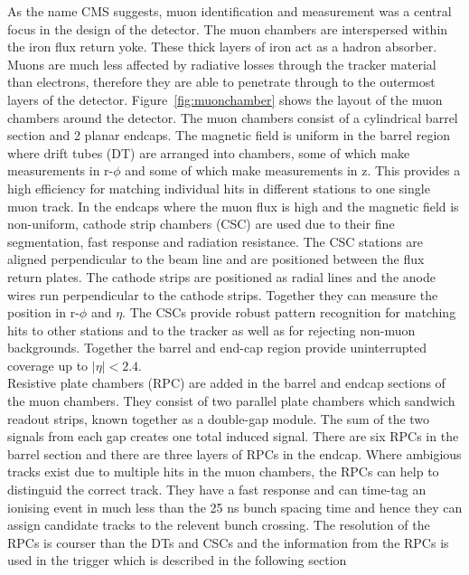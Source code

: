 As the name CMS suggests, muon identification and measurement was a central focus in the design of the detector. The muon chambers are interspersed within the iron flux return yoke. These thick layers of iron act as a hadron absorber. Muons are much less affected by radiative losses through the tracker material than electrons, therefore they are able to penetrate through to the outermost layers of the detector. Figure~\ref{fig:muonchamber} shows the layout of the muon chambers around the detector. The muon chambers consist of a cylindrical barrel section and 2 planar endcaps. The magnetic field is uniform in the barrel region where drift tubes (DT) are arranged into chambers, some of which make measurements in r-$\phi$ and some of which make measurements in z. This provides a high efficiency for matching individual hits in different stations to one single muon track.
In the endcaps where the muon flux is high and the magnetic field is non-uniform, cathode strip chambers (CSC) are used due to their fine segmentation, fast response and radiation resistance. The CSC stations are aligned perpendicular to the beam line and are positioned between the flux return plates. The cathode strips are positioned as radial lines and the anode wires run perpendicular to the cathode strips. Together they can measure the position in r-$\phi$ and $\eta$. The CSCs provide robust pattern recognition for matching hits to other stations and to the tracker as well as for rejecting non-muon backgrounds. 
Together the barrel and end-cap region provide uninterrupted coverage up to $|\eta|<2.4$.\\
Resistive plate chambers (RPC) are added in the barrel and endcap sections of the muon chambers. They consist of two parallel plate chambers which sandwich readout strips, known together as a double-gap module. The sum of the two signals from each gap creates one total induced signal. There are six RPCs in the barrel section and there are three layers of RPCs in the endcap.
 Where ambigious tracks exist due to multiple hits in the muon chambers, the RPCs can help to distinguid the correct track. They have a fast response and can time-tag an ionising event in much less than the 25 ns bunch spacing time and hence they can assign candidate tracks to the relevent bunch crossing. The resolution of the RPCs is courser than the DTs and CSCs and the information from the RPCs is used in the trigger which is described in the following section


